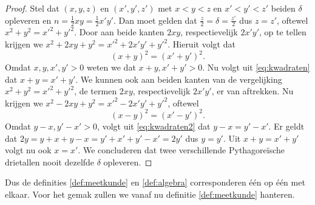 \documentclass[12pt,reqno]{article}
\theoremstyle{theorem}
\theoremstyle{definition}
\begin{document}
\begin{proof}
		 Stel dat $(x,y,z)$ en $(x',y',z')$ met $x < y < z$ en $x' < y' < z'$ beiden $\delta$ opleveren en $n = \frac{1}{2}xy = \frac{1}{2}x'y'$. Dan moet gelden dat $\frac{z}{2} = \delta = \frac{z'}{2}$ dus $z = z'$, oftewel $x^2 + y^2 = x'^2 + y'^2$. Door aan beide kanten $2xy$, respectievelijk $2x'y'$, op te tellen krijgen we $x^2 + 2xy + y^2 = x'^2 + 2x'y' + y'^2$. Hieruit volgt dat 
		 \begin{equation}
		 (x + y)^2 = (x' + y')^2.\label{eq:kwadraten}
		 \end{equation}
		 Omdat $x,y,x',y'>0$ weten we dat $x + y, x' + y'> 0$. Nu volgt uit \eqref{eq:kwadraten} dat $x + y = x' + y'$. We kunnen ook aan beiden kanten van de vergelijking $x^2 + y^2 = x'^2 + y'^2$, de termen $2xy$, respectievelijk $2x'y'$, er van aftrekken. Nu krijgen we $x^2 - 2xy + y^2 = x'^2 - 2x'y' + y'^2$, oftewel
		 \begin{equation}
		 (x - y)^2 = (x' - y')^2.\label{eq:kwadraten2}
		 \end{equation}
		 Omdat $y - x, y' - x' > 0$, volgt uit \eqref{eq:kwadraten2} dat $y - x = y' - x'$. Er geldt dat $2y = y + x + y - x = y' + x' + y' - x' = 2y'$ dus $y = y'$. Uit $x + y = x' + y'$ volgt nu ook $x = x'$. We concluderen dat twee verschillende Pythagore\"ische drietallen nooit dezelfde $\delta$ opleveren.
	\end{proof}
	Dus de definities \ref{def:meetkunde} en \ref{def:algebra} corresponderen \'e\'en op \'e\'en met elkaar. Voor het gemak zullen we vanaf nu definitie \ref{def:meetkunde} hanteren. \\
	
\end{document}
